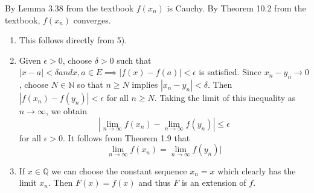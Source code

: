 \documentclass[paper=a4, fontsize=11pt]{jhwhw} %
\begin{document}
By Lemma 3.38 from the textbook $f(x_n)$ is Cauchy. By Theorem 10.2 from the textbook, $f(x_n)$ converges.

\begin{enumerate}
    \item This follows directly from 5).
    \item Given $\epsilon > 0$, choose $\delta > 0$ such that $|x-a| < \delta and x,a\in E \implies |f(x) - f(a)| < \epsilon$ is satisfied. Since $x_n - y_n \to 0$, choose $N\in \mathbb N$ so that $n\ge N$ implies $|x_n - y_n| < \delta$. Then $|f(x_n) - f(y_n)| < \epsilon$ for all $n \ge N$. Taking the limit of this inequality as $n\to \infty$, we obtain
        $$|\lim\limits_{n\to\infty}f(x_n) - \lim\limits_{n\to\infty}f(y_n)| \le \epsilon$$
        for all $\epsilon > 0$. It follows from Theorem 1.9 that 
        $$\lim\limits_{n\to\infty}f(x_n) = \lim\limits_{n\to\infty}f(y_n)|$$
    \item If $x\in \mathbb Q$ we can choose the constant sequence $x_n = x$ which clearly has the limit $x_n$. Then $F(x) = f(x)$ and thus $F$ is an extension of $f$.
\end{enumerate}
\end{document}
